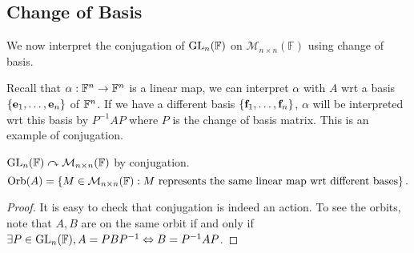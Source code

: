 \documentclass[10pt]{article}
\begin{document}
    \subsection{Change of Basis}
    We now interpret the conjugation of $ \mathrm{GL}_n({\mathbb{F}}) $ on $ \mathcal{M}_{n\times n}(\mathbb{F}) $ using change of basis.

    Recall that $ \alpha: {\mathbb{F}}^n \to {\mathbb{F}}^n $ is a linear map, we can interpret $\alpha$ with $A$ wrt a basis $ \{{\bf e}_1,\dots,{\bf e}_n\} $ of $ {\mathbb{F}}^n $. If we have a different basis $ \{{\bf f}_1,\dots,{\bf f}_n\} $, $\alpha$ will be interpreted wrt this basis by $ P^{-1}AP $ where $P$ is the change of basis matrix. This is an example of conjugation.
    \begin{proposition}\label{prop:7.9}
        $ \mathrm{GL}_n({\mathbb{F}}) \curvearrowright \mathcal{M}_{n\times n}(\mathbb{F}) $ by conjugation. 
        \[
            \operatorname{Orb}(A)=\left\{ M\in \mathcal{M}_{n\times n}(\mathbb{F}): M \text{ represents the same linear map wrt different bases} \right\}.
        \]
    \end{proposition}
    \begin{proof}
        It is easy to check that conjugation is indeed an action. To see the orbits, note that $ A,B $ are on the same orbit if and only if $ \exists P\in \mathrm{GL}_n({\mathbb{F}}), A = PBP^{-1} \Leftrightarrow B=P^{-1}AP $.
    \end{proof}
\end{document}
